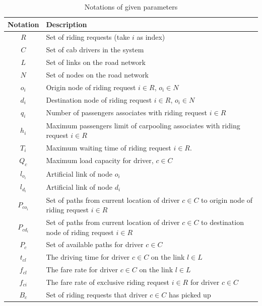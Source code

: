 \renewcommand\arraystretch{1.5}
\par
\begin{table}[ht]
  \centering
  \caption{Notations of given parameters}
  \begin{tabularx}{\textwidth}{cX}
  \toprule
  Notation & Description \\
  \midrule
    $R$ & Set of riding requests (take $i$ as index) \\
    $C$ & Set of cab drivers in the system \\
    $L$ & Set of links on the road network \\
    $N$ & Set of nodes on the road network \\
    $o_i$ & Origin node of riding request $i \in R$, $o_i \in N$ \\
    $d_i$ & Destination node of riding request $i \in R$, $o_i \in N$ \\
    $q_i$ & Number of passengers associates with riding request $i \in R$ \\
    $h_i$ & Maximum passengers limit of carpooling associates with riding request $i \in R$ \\
    $T_i$ & Maximum waiting time of riding request $i \in R$. \\
    $Q_c$ & Maximum load capacity for driver, $c \in C$ \\
    $l_{o_i}$ & Artificial link of node $o_i$ \\
    $l_{d_i}$ & Artificial link of node $d_i$ \\
    $P_{co_i}$ & Set of paths from current location of driver $c \in C$ to origin node of riding request $i \in R$ \\
    $P_{cd_i}$ & Set of paths from current location of driver $c \in C$ to destination node of riding request $i \in R$ \\
    $P_c$ & Set of available paths for driver $c \in C$  \\
    $t_{cl}$ & The driving time for driver $c \in C$ on the link $l \in L$ \\
    $f_{cl}$ & The fare rate for driver $c \in C$ on the link $l \in L$ \\
    $f_{ci}$ & The fare rate of exclusive riding request $i \in R$ for driver $c \in C$ \\
    $B_c$ & Set of riding requests that driver $c \in C$ has picked up \\
  \bottomrule
  \end{tabularx}
\end{table}  
\par

